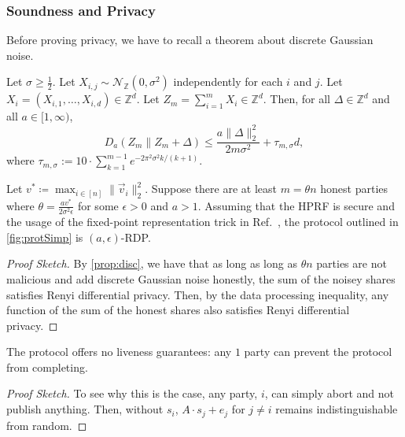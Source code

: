 \subsubsection*{Soundness and Privacy}

Before proving privacy, we have to recall a theorem about discrete Gaussian noise.


\begin{proposition}
	\label{prop:disc}
	Let $\sigma \geq \frac{1}{2}$.
	Let $X_{i,j} \sim \mathcal{N}_\mathbb{Z}(0, \sigma^2)$ independently for each $i$ and $j$.
	Let $X_i = (X_{i,1}, \dots, X_{i,d}) \in \mathbb{Z}^d$.
	Let $Z_m = \sum_{i=1}^m X_i \in \mathbb{Z}^d$. Then, for all $\Delta \in \mathbb{Z}^d$ and all $a \in [1, \infty)$,
	\[
		D_a(Z_m \parallel Z_m + \Delta) \leq \frac{a \|\Delta\|_2^2}{2m\sigma^2} + \tau_{m,\sigma} d,
	\]
	where $\tau_{m,\sigma} := 10 \cdot \sum_{k=1}^{m-1} e^{-2\pi^2\sigma^2k/(k+1)}$.
\end{proposition}


\begin{theorem}
	Let $v^\ast \coloneqq \max_{i \in[n]} \|\vec{v}_i\|_2^2$.
	Suppose there are at least $m = \theta n$ honest parties where $\theta = \frac{a v^\ast}{2\sigma^2 \epsilon}$ for some $\epsilon > 0$ and $a > 1$.
	Assuming that the HPRF is secure and the usage of the fixed-point representation trick in Ref.~\cite{stevens2021efficientdifferentiallyprivatesecure}, the protocol outlined in \cref{fig:protSimp} is $(a, \epsilon)$-RDP.
\end{theorem}
\begin{proof}[Proof Sketch]
	By \cref{prop:disc}, we have that as long as long as $\theta n$ parties are not malicious and add discrete Gaussian noise honestly, the sum of the noisey shares satisfies Renyi differential privacy.
	Then, by the data processing inequality, any function of the sum of the honest shares also satisfies Renyi differential privacy.
\end{proof}

\begin{theorem}[Liveness]
	The protocol offers no liveness guarantees: any $1$ party can prevent the protocol from completing.
\end{theorem}
\begin{proof}[Proof Sketch]
	To see why this is the case, any party, $i$, can simply abort and not publish anything.
	Then, without $s_i$, $A \cdot s_j + e_j$ for $j \neq i$ remains indistinguishable from random.
\end{proof}


